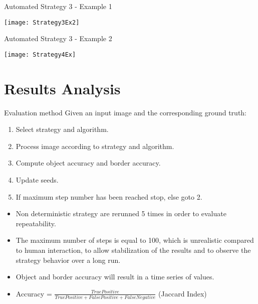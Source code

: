 \begin{frame}[t,fragile]{Automated Strategy 3 - Example 1}
\begin{center}
\texttt{[image: Strategy3Ex2]}
\end{center}
\end{frame}

\begin{frame}[t,fragile]{Automated Strategy 3 - Example 2}
\begin{center}
\texttt{[image: Strategy4Ex]}
\end{center}
\end{frame}

\section{Results Analysis}
\begin{frame}[t,fragile]{Evaluation method}
Given an input image and the corresponding ground truth:
\begin{enumerate}
\item Select strategy and algorithm.
\item Process image according to strategy and algorithm.
\item Compute object accuracy and border accuracy.
\item Update seeds.
\item If maximum step number has been reached stop, else goto 2.
\end{enumerate}
\begin{itemize}
  \item Non deterministic strategy are rerunned 5 times in order to evaluate repeatability.
  \item The maximum number of steps is equal to 100, which is unrealistic compared to human interaction, to allow stabilization of the results and to observe the strategy behavior over a long run.
  \item Object and border accuracy will result in a time series of values.
  \item Accuracy =  $\frac{TruePositive}{TruePositive+FalsePositive+FalseNegative}$ (Jaccard Index)
\end{itemize}
\end{frame}

